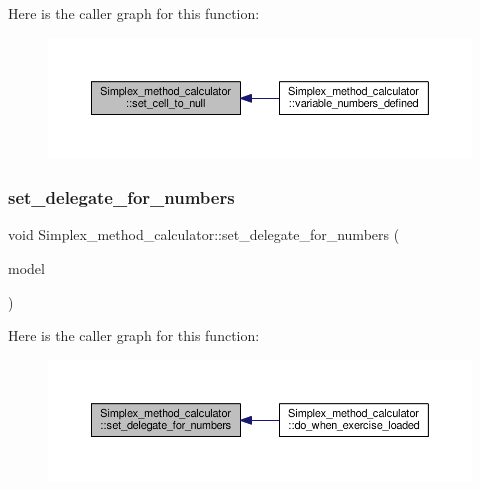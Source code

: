 Here is the caller graph for this function\+:\nopagebreak
\begin{figure}[H]
\begin{center}
\leavevmode
\includegraphics[width=350pt]{classSimplex__method__calculator_afcff0009b07937efe20f3d64ea10d550_icgraph}
\end{center}
\end{figure}
\mbox{\label{classSimplex__method__calculator_a7100231e1d6a4da05a79f5aaeeb2a693}} 
\subsubsection{\texorpdfstring{set\+\_\+delegate\+\_\+for\+\_\+numbers}{set\_delegate\_for\_numbers}}
{\footnotesize\ttfamily void Simplex\+\_\+method\+\_\+calculator\+::set\+\_\+delegate\+\_\+for\+\_\+numbers (\begin{DoxyParamCaption}\item[{Q\+Styled\+Item\+Delegate $\ast$}]{model }\end{DoxyParamCaption})\hspace{0.3cm}{\ttfamily [signal]}}

Here is the caller graph for this function\+:\nopagebreak
\begin{figure}[H]
\begin{center}
\leavevmode
\includegraphics[width=350pt]{classSimplex__method__calculator_a7100231e1d6a4da05a79f5aaeeb2a693_icgraph}
\end{center}
\end{figure}
\mbox{\label{classSimplex__method__calculator_a49ee6c7aaf6f7429b2d7bb3110ead22f}} 
